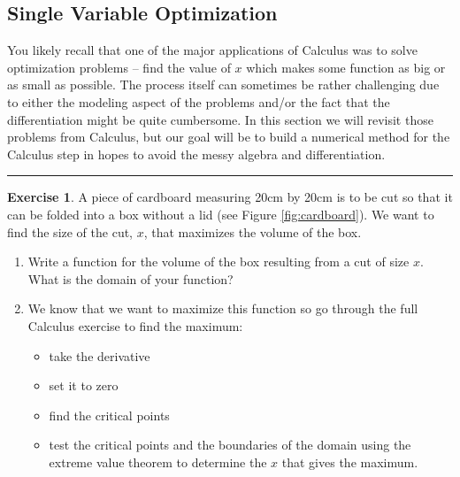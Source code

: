 \documentclass[
]{book}
\theoremstyle{definition}
\theoremstyle{definition}
\theoremstyle{definition}
\newtheorem{exercise}{Exercise}[chapter]
\theoremstyle{remark}
\begin{document}
\hypertarget{single-variable-optimization}{%
\subsection{Single Variable Optimization}\label{single-variable-optimization}}

You likely recall that one of the major applications of Calculus was to
solve optimization problems -- find the value of \(x\) which makes some
function as big or as small as possible. The process itself can
sometimes be rather challenging due to either the modeling aspect of the
problems and/or the fact that the differentiation might be quite
cumbersome. In this section we will revisit those problems from
Calculus, but our goal will be to build a numerical method for the
Calculus step in hopes to avoid the messy algebra and differentiation.

\begin{center}\rule{0.5\linewidth}{0.5pt}\end{center}

\begin{exercise}
\protect\hypertarget{exr:cardboard-problem}{}{\label{exr:cardboard-problem} }A piece of cardboard measuring 20cm by 20cm is to be cut so that it can be folded into a box without a lid (see Figure \ref{fig:cardboard}). We want to find the size of the cut, \(x\), that maximizes the volume of the box.

\begin{enumerate}
\def\labelenumi{\alph{enumi}.}
\item
  Write a function for the volume of the box resulting from a cut of
  size \(x\). What is the domain of your function?
\item
  We know that we want to maximize this function so go through the
  full Calculus exercise to find the maximum:

  \begin{itemize}
  \item
    take the derivative
  \item
    set it to zero
  \item
    find the critical points
  \item
    test the critical points and the boundaries of the domain using
    the extreme value theorem to determine the \(x\) that gives the
    maximum.
  \end{itemize}
\end{enumerate}
\end{exercise}
\end{document}
